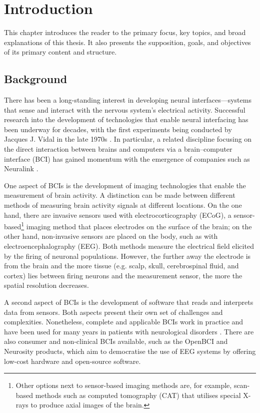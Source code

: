 \chapter{Introduction}
\graphicspath{{Chapter1/Figs/}{Chapter1/Figs/}}

This chapter introduces the reader to the primary focus, key topics, and broad explanations of this thesis. It also presents the supposition, goals, and objectives of its primary content and structure.

\section{Background}
\label{chapter1-background}

There has been a long-standing interest in developing neural interfaces—systems that sense and interact with the nervous system’s electrical activity. Successful research into the development of technologies that enable neural interfacing has been underway for decades, with the first experiments being conducted by Jacques J. Vidal in the late 1970s \citep{vidal_real-time_1977}. In particular, a related discipline focusing on the direct interaction between brains and computers via a brain–computer interface (BCI) has gained momentum with the emergence of companies such as Neuralink \citep{mor_brain-computer_2021}.

One aspect of BCIs is the development of imaging technologies that enable the measurement of brain activity. A distinction can be made between different methods of measuring brain activity signals at different locations. On the one hand, there are invasive sensors used with electrocorticography (ECoG), a sensor-based\footnote{Other options next to sensor-based imaging methods are, for example, scan-based methods such as computed tomography (CAT) that utilises special X-rays to produce axial images of the brain.} imaging method that places electrodes on the surface of the brain; on the other hand, non-invasive sensors are placed on the body, such as with electroencephalography (EEG). Both methods measure the electrical field elicited by the firing of neuronal populations. However, the further away the electrode is from the brain and the more tissue (e.g. scalp, skull, cerebrospinal fluid, and cortex) lies between firing neurons and the measurement sensor, the more the spatial resolution decreases.

A second aspect of BCIs is the development of software that reads and interprets data from sensors. Both aspects present their own set of challenges and complexities. Nonetheless, complete and applicable BCIs work in practice and have been used for many years in patients with neurological disorders \citep{braingate_publications_nodate}. There are also consumer and non-clinical BCIs available, such as the OpenBCI and Neurosity products, which aim to democratise the use of EEG systems by offering low-cost hardware and open-source software.


